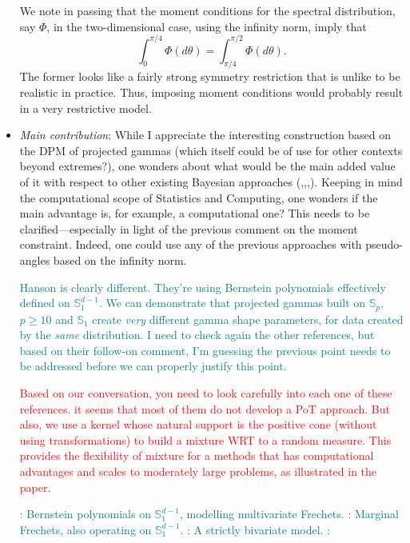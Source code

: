 \documentclass[10pt]{article}
\newcommand{\comment}[1]{\textcolor{teal}{#1}}
\newcommand{\bruno}[1]{\textcolor{red}{#1}}
\begin{document}
\begin{itemize}
We note in passing that the moment conditions for the spectral
distribution, say $\Phi$, in the two-dimensional case, using the 
infinity norm, imply that 
\[
	\int_0^{\pi/4} \Phi(d\theta) = \int_{\pi/4}^{\pi/2}
\Phi(d\theta).
\]
The former looks like a fairly strong symmetry restriction that is
unlike to be realistic in practice. Thus, imposing moment
conditions would probably result in a very restrictive model.


    \item \emph{Main contribution}: While I appreciate the interesting construction based on the 
    DPM of projected gammas (which itself could be of use for other contexts beyond extremes?), 
    one wonders about what would be the main added value of it with respect to other existing 
    Bayesian approaches (\cite{boldi2007},\cite{guillotte2011},\cite{sabourin2014},\cite{hanson2017}).
    Keeping in mind the computational scope of Statistics and Computing, one wonders if the main 
    advantage is, for example, a computational one? This needs to be clarified—especially in light 
    of the previous comment on the moment constraint. Indeed, one could use any of the previous 
    approaches with pseudo-angles based on the infinity norm.

    \comment{Hanson is clearly different.  They're using Bernstein polynomials effectively defined 
    on $\mathbb{S}_1^{d-1}$.  We can demonstrate that projected gammas built on $\mathbb{S}_{p}$, 
    $p \geq 10$ and $\mathbb{S}_1$ create \emph{very} different gamma shape parameters, for data
    created by the \emph{same} distribution.  I need to check again the other references, but 
    based on their follow-on comment, I'm guessing the previous point needs to be addressed before 
    we can properly justify this point.}
    
    \bruno{Based on our conversation, you need to look carefully into each one of these references.
    it seems that most of them do not develop a PoT approach. But also, we use a kernel whose natural 
    support is the positive cone (without using transformations) to build a mixture WRT to a random
    measure. This provides the flexibility of mixture for a methods that has computational advantages 
    and scales to moderately large problems, as illustrated in the paper.}

    \comment{\cite{hanson2017}: Bernstein polynomials on $\mathbb{S}_1^{d-1}$, modelling multivariate Frechets.  \cite{boldi2007}: Marginal Frechets, also operating on $\mathbb{S}_1^{d-1}$.  \cite{guillotte2011}: A strictly bivariate model.  \cite{sabourin2014}: }


\end{itemize}
\end{document}
